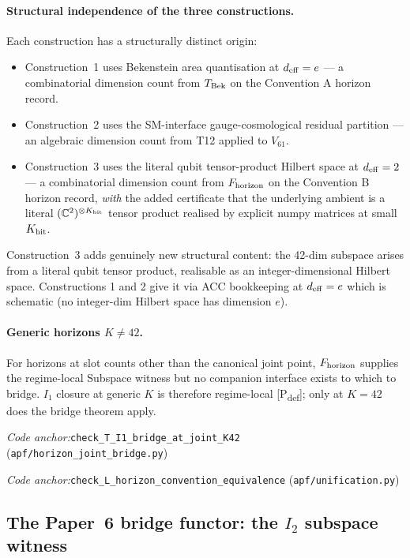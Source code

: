 \documentclass[11pt]{article}
\theoremstyle{plain}
\theoremstyle{definition}
\theoremstyle{remark}
\newcommand{\coderef}[2]{\par\noindent\textit{Code anchor:}\quad\texttt{#1} (\texttt{#2})}
\begin{document}
\paragraph{Structural independence of the three constructions.}  Each construction has a structurally distinct origin:
\begin{itemize}[leftmargin=2em,itemsep=2pt]
  \item Construction~1 uses Bekenstein area quantisation at $d_{\rm eff} = e$ --- a combinatorial dimension count from $T_{\rm Bek}$ on the Convention A horizon record.
  \item Construction~2 uses the SM-interface gauge-cosmological residual partition --- an algebraic dimension count from T12 applied to $V_{61}$.
  \item Construction~3 uses the literal qubit tensor-product Hilbert space at $d_{\rm eff} = 2$ --- a combinatorial dimension count from $F_{\rm horizon}$ on the Convention B horizon record, \emph{with} the added certificate that the underlying ambient is a literal $(\mathbb{C}^2)^{\otimes K_{\rm bit}}$ tensor product realised by explicit numpy matrices at small $K_{\rm bit}$.
\end{itemize}
Construction~3 adds genuinely new structural content: the 42-dim subspace arises from a literal qubit tensor product, realisable as an integer-dimensional Hilbert space.  Constructions 1 and 2 give it via ACC bookkeeping at $d_{\rm eff} = e$ which is schematic (no integer-dim Hilbert space has dimension $e$).

\paragraph{Generic horizons $K \neq 42$.}  For horizons at slot counts other than the canonical joint point, $F_{\rm horizon}$ supplies the regime-local Subspace witness but no companion interface exists to which to bridge.  $I_1$ closure at generic $K$ is therefore regime-local [P\textsubscript{def}]; only at $K = 42$ does the bridge theorem apply.

\coderef{check\_T\_I1\_bridge\_at\_joint\_K42}{apf/horizon\_joint\_bridge.py}
\coderef{check\_L\_horizon\_convention\_equivalence}{apf/unification.py}

\bigskip

\subsection{The Paper~6 bridge functor: the \texorpdfstring{$I_2$}{I2} subspace witness}\label{supp:E3}
\end{document}
